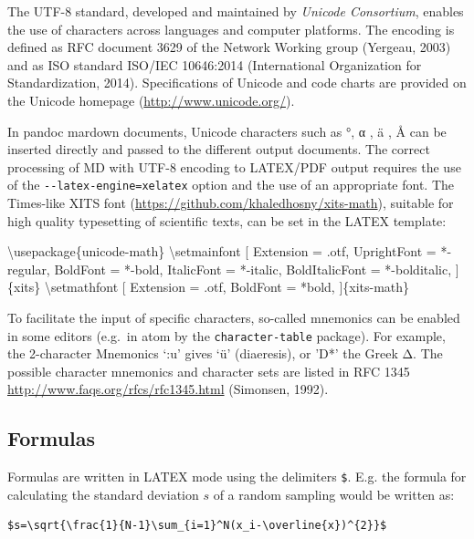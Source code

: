 \documentclass[10pt,fleqn]{wlpeerj}
\newenvironment{Shaded}{}{}
\newcommand{\NormalTok}[1]{{#1}}
\begin{document}
The UTF-8 standard, developed and maintained by \emph{Unicode
Consortium}, enables the use of characters across languages and computer
platforms. The encoding is defined as RFC document 3629 of the Network
Working group (Yergeau, 2003) and as ISO standard ISO/IEC 10646:2014
(International Organization for Standardization, 2014). Specifications
of Unicode and code charts are provided on the Unicode homepage
(\url{http://www.unicode.org/}).

In pandoc mardown documents, Unicode characters such as °, α , ä , Å can
be inserted directly and passed to the different output documents. The
correct processing of MD with UTF-8 encoding to LATEX/PDF output
requires the use of the \texttt{-\/-latex-engine=xelatex} option and the
use of an appropriate font. The Times-like XITS font
(\url{https://github.com/khaledhosny/xits-math}), suitable for high
quality typesetting of scientific texts, can be set in the LATEX
template:

\begin{Shaded}
\begin{Highlighting}[]
\NormalTok{\textbackslash{}usepackage\{unicode-math\}}
\NormalTok{\textbackslash{}setmainfont}
\NormalTok{[    Extension = .otf,}
   \NormalTok{UprightFont = *-regular,}
      \NormalTok{BoldFont = *-bold,}
    \NormalTok{ItalicFont = *-italic,}
\NormalTok{BoldItalicFont = *-bolditalic,}
\NormalTok{]\{xits\}}
\NormalTok{\textbackslash{}setmathfont}
\NormalTok{[    Extension = .otf,}
      \NormalTok{BoldFont = *bold,}
\NormalTok{]\{xits-math\}}
\end{Highlighting}
\end{Shaded}

To facilitate the input of specific characters, so-called mnemonics can
be enabled in some editors (e.g.~in atom by the \texttt{character-table}
package). For example, the 2-character Mnemonics `:u' gives `ü'
(diaeresis), or 'D*' the Greek Δ. The possible character mnemonics and
character sets are listed in RFC 1345
\url{http://www.faqs.org/rfcs/rfc1345.html} (Simonsen, 1992).

\subsection{Formulas}\label{formulas}

Formulas are written in LATEX mode using the delimiters \texttt{\$}.
E.g. the formula for calculating the standard deviation \(s\) of a
random sampling would be written as:

\begin{verbatim}
$s=\sqrt{\frac{1}{N-1}\sum_{i=1}^N(x_i-\overline{x})^{2}}$
\end{verbatim}
\end{document}
